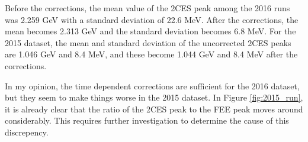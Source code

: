 \documentclass[11pt]{article}
\begin{document}
Before the corrections, the mean value of the 2CES peak among the 2016 runs was 2.259 GeV with a standard deviation of 22.6 MeV.  After the corrections, the mean becomes 2.313 GeV and the standard deviation becomes 6.8 MeV.  For the 2015 dataset, the mean and standard deviation of the uncorrected 2CES peaks are 1.046 GeV and 8.4 MeV, and these become 1.044 GeV and 8.4 MeV after the corrections.  

In my opinion, the time dependent corrections are sufficient for the 2016 dataset, but they seem to make things worse in the 2015 dataset.  In Figure \ref{fig:2015_run}, it is already clear that the ratio of the 2CES peak to the FEE peak moves around considerably.  This requires further investigation to determine the cause of this discrepency.  
\end{document}
